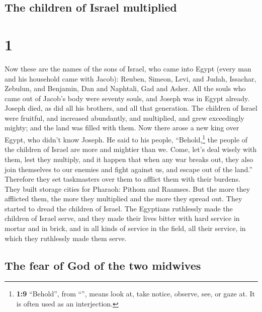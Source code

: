\hypertarget{the-children-of-israel-multiplied}{%
\subsection{The children of Israel
multiplied}\label{the-children-of-israel-multiplied}}

\hypertarget{section}{%
\section{1}\label{section}}

 Now these are the names of the sons of Israel, who came
into Egypt (every man and his household came with Jacob): 
Reuben, Simeon, Levi, and Judah,  Issachar, Zebulun, and
Benjamin,  Dan and Naphtali, Gad and Asher. 
All the souls who came out of Jacob's body were seventy souls, and
Joseph was in Egypt already.  Joseph died, as did all his
brothers, and all that generation.  The children of Israel
were fruitful, and increased abundantly, and multiplied, and grew
exceedingly mighty; and the land was filled with them. 
Now there arose a new king over Egypt, who didn't know Joseph.
 He said to his people, ``Behold,\footnote{\textbf{1:9}
  ``Behold'', from ``'', means look at, take notice,
  observe, see, or gaze at. It is often used as an interjection.} the
people of the children of Israel are more and mightier than we.
 Come, let's deal wisely with them, lest they multiply,
and it happen that when any war breaks out, they also join themselves to
our enemies and fight against us, and escape out of the land.''
 Therefore they set taskmasters over them to afflict them
with their burdens. They built storage cities for Pharaoh: Pithom and
Raamses.  But the more they afflicted them, the more they
multiplied and the more they spread out. They started to dread the
children of Israel.  The Egyptians ruthlessly made the
children of Israel serve,  and they made their lives
bitter with hard service in mortar and in brick, and in all kinds of
service in the field, all their service, in which they ruthlessly made
them serve.

\hypertarget{the-fear-of-god-of-the-two-midwives}{%
\subsection{The fear of God of the two
midwives}\label{the-fear-of-god-of-the-two-midwives}}

